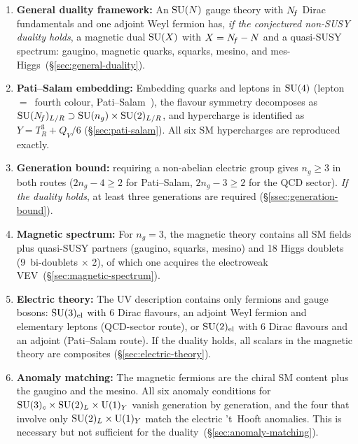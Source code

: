 \documentclass[11pt,a4paper]{article}
\begin{document}
\begin{tcolorbox}[
  enhanced,
  colback=green!5!white,
  colframe=green!60!black,
  fonttitle=\bfseries,
  title={Lecture 7: Summary}
]
\begin{enumerate}
  \item \textbf{General duality framework:}
    An $\mathrm{SU}(N)$ gauge theory with $N_{\!f}$ Dirac fundamentals and one
    adjoint Weyl fermion has, \emph{if the conjectured non-SUSY duality
    holds}, a magnetic dual $\mathrm{SU}(X)$ with $X = N_{\!f} - N$ and a
    quasi-SUSY spectrum: gaugino, magnetic quarks, squarks, mesino,
    and mes-Higgs~(\S\ref{sec:general-duality}).

  \item \textbf{Pati--Salam embedding:}
    Embedding quarks and leptons in $\mathrm{SU}(4)$ (lepton~$=$~fourth colour,
    Pati--Salam~\cite{PS1974}), the flavour symmetry decomposes as
    $\mathrm{SU}(N_{\!f})_{L/R} \supset \mathrm{SU}(n_g) \times \mathrm{SU}(2)_{L/R}$, and
    hypercharge is identified as $Y = T_R^3 + Q_V/6$
    (\S\ref{sec:pati-salam}).  All six SM hypercharges are reproduced
    exactly.

  \item \textbf{Generation bound:}
    requiring a non-abelian electric group gives $n_g \geq 3$ in both
    routes ($2n_g - 4 \geq 2$ for Pati--Salam, $2n_g - 3 \geq 2$ for the
    QCD sector).  \emph{If the duality holds}, at least three
    generations are required (\S\ref{ssec:generation-bound}).

  \item \textbf{Magnetic spectrum:}
    For $n_g = 3$, the magnetic theory contains all SM fields plus
    quasi-SUSY partners (gaugino, squarks, mesino) and 18 Higgs
    doublets (9~bi-doublets $\times$ 2), of which one acquires the
    electroweak VEV~(\S\ref{sec:magnetic-spectrum}).

  \item \textbf{Electric theory:}
    The UV description contains only fermions and gauge bosons:
    $\mathrm{SU}(3)_{\mathrm{el}}$ with 6 Dirac flavours, an adjoint Weyl
    fermion and elementary leptons (QCD-sector route), or
    $\mathrm{SU}(2)_{\mathrm{el}}$ with 6 Dirac flavours and an adjoint
    (Pati--Salam route).  If the duality holds, all scalars in the
    magnetic theory are composites
    (\S\ref{sec:electric-theory}).

  \item \textbf{Anomaly matching:}
    The magnetic fermions are the chiral SM content plus the gaugino
    and the mesino.  All six anomaly conditions for
    $\mathrm{SU}(3)_c \times \mathrm{SU}(2)_L \times \mathrm{U}(1)_Y$ vanish generation by
    generation, and the four that involve only $\mathrm{SU}(2)_L \times
    \mathrm{U}(1)_Y$ match the electric 't~Hooft anomalies.  This is necessary
    but not sufficient for the duality~(\S\ref{sec:anomaly-matching}).
\end{enumerate}
\end{tcolorbox}
\end{document}
